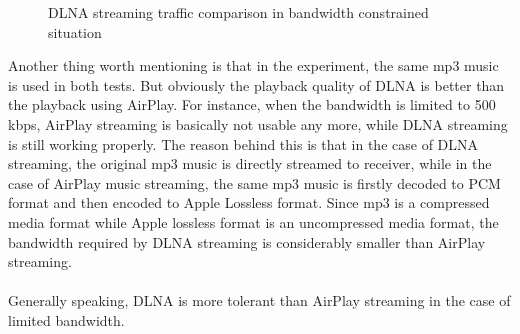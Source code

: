 \begin{figure}[hb]%
\caption{DLNA streaming traffic comparison in
bandwidth constrained situation\label{dlna_traffic_bw_1}}
\end{figure}
\clearpage
Another thing worth mentioning is that in the experiment, the same mp3 music is used in both tests. But obviously the playback quality of DLNA is better than the playback using AirPlay. For instance, when the bandwidth is limited to 500 kbps, AirPlay streaming is basically not usable any more, while DLNA streaming is still working properly. The reason behind this is that in the case of DLNA streaming, the original mp3 music is directly streamed to receiver, while in the case of AirPlay music streaming, the same mp3 music is firstly decoded to PCM format and then encoded to Apple Lossless format. Since mp3 is a compressed media format while Apple lossless format is an uncompressed media format, the bandwidth required by DLNA streaming is considerably smaller than AirPlay streaming.\\
\\
Generally speaking, DLNA is more tolerant than AirPlay streaming in the case of limited bandwidth.

